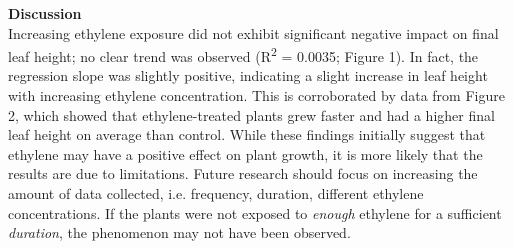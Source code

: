\documentclass{report}
\begin{document}
\begin{multicols}{3}
  \textbf{Discussion}\\
  Increasing ethylene exposure did not exhibit significant negative impact on final leaf height; no clear trend was observed (R\textsuperscript{2} = 0.0035; Figure 1). In fact, the regression slope was slightly positive, indicating a slight increase in leaf height with increasing ethylene concentration. This is corroborated by data from Figure 2, which showed that ethylene-treated plants grew faster and had a higher final leaf height on average than control. While these findings initially suggest that ethylene may have a positive effect on plant growth, it is more likely that the results are due to limitations. Future research should focus on increasing the amount of data collected, i.e. frequency, duration, different ethylene concentrations. If the plants were not exposed to \textit{enough} ethylene for a sufficient \textit{duration}, the phenomenon may not have been observed.
  
\end{multicols}

\clearpage


\printbibliography
\end{document}
